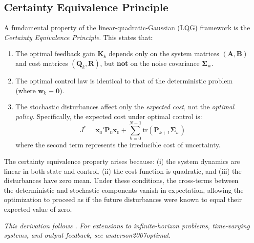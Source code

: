 \documentclass[12pt, a4paper]{article}
\begin{document}
\subsection{Certainty Equivalence Principle}

A fundamental property of the linear-quadratic-Gaussian (LQG) 
framework is the \textit{Certainty Equivalence Principle}. This 
states that:

\begin{enumerate}
    \item The optimal feedback gain $\bm{K}_k$ depends only on the 
    system matrices $(\bm{A}, \bm{B})$ and cost matrices 
    $(\bm{Q}_k, \bm{R})$, but \textbf{not} on the noise covariance 
    $\bm{\Sigma}_w$.
    
    \item The optimal control law is identical to that of the 
    deterministic problem (where $\bm{w}_k \equiv \bm{0}$).
    
    \item The stochastic disturbances affect only the 
    \textit{expected cost}, not the \textit{optimal policy}. 
    Specifically, the expected cost under optimal control is:
    \begin{equation}
        J^* = \bm{x}_0' \bm{P}_0 \bm{x}_0 + 
        \sum_{k=0}^{N-1} \text{tr}(\bm{P}_{k+1} \bm{\Sigma}_w)
        \label{eq:app_expected_cost}
    \end{equation}
    where the second term represents the irreducible cost of 
    uncertainty.
\end{enumerate}

\noindent The certainty equivalence property arises because: (i) the system 
dynamics are linear in both state and control, (ii) the cost 
function is quadratic, and (iii) the disturbances have zero mean. 
Under these conditions, the cross-terms between the deterministic 
and stochastic components vanish in expectation, allowing the 
optimization to proceed as if the future disturbances were known 
to equal their expected value of zero.

\vspace{5mm}

\noindent\textit{This derivation follows \citet[Chapter~3.1]{bertsekas2017dynamic}. 
For extensions to infinite-horizon problems, time-varying systems, 
and output feedback, see anderson2007optimal.}
\end{document}
